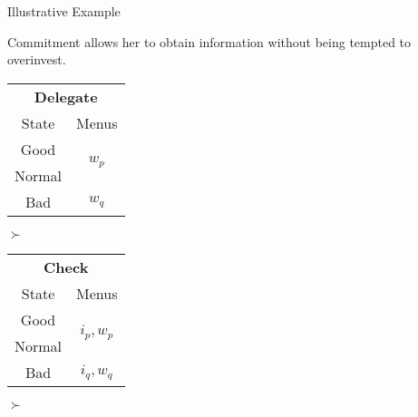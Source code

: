 \documentclass[usenames,dvipsnames,aspectratio=169,11pt, envcountsect, handout]{beamer}
\begin{document}
\begin{frame}[noframenumbering]{Illustrative Example}

	Commitment allows her to obtain information without being tempted to overinvest.

	\vfill

	\begin{table}[H]
		\centering
		\begin{minipage}{0.29\textwidth}
			\centering
			\begin{tabular}{c | c}
				\multicolumn{2}{c}{\textbf{Delegate}}                           \\
				State                & Menus                                    \\
				\hline
				{\color{blue}Good}   & \multirow{2}{*}{{\color{blue}\( w_p \)}} \\
				{\color{blue}Normal} &                                          \\
				\hline
				Bad                  & \( w_q \)                                \\
			\end{tabular}
			\vspace{0.5cm} %
		\end{minipage}\hspace{0.3cm} %
		\( \succ \) %
		\begin{minipage}{0.29\textwidth}
			\centering
			\begin{tabular}{c | c}
				\multicolumn{2}{c}{\textbf{Check}}                                     \\
				State                & Menus                                           \\
				\hline
				{\color{blue}Good}   & \multirow{2}{*}{{\color{blue}\( i_{p}, w_p \)}} \\
				{\color{blue}Normal} &                                                 \\
				\hline
				Bad                  & \(  i_{q}, w_q \)                               \\
			\end{tabular}
			\vspace{0.5cm} %
		\end{minipage}\hspace{0.3cm} %
		\( \succ \) %

\end{table}
\end{frame}
\end{document}
